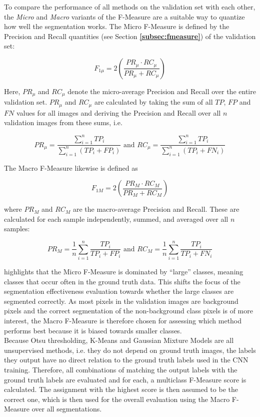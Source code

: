 \noindent To compare the performance of all methods on the validation set with each other, the \textit{Micro} and \textit{Macro} variants of the F-Measure \cite{micromacro} are a suitable way to quantize how well the segmentation works. The Micro F-Measure is defined by the Precision and Recall quantities (see Section \textbf{\ref{subsec:fmeasure}}) of the validation set:

\[ F_{1\mu} = 2 \left ( \frac{PR_\mu \cdot RC_\mu}{PR_\mu + RC_\mu} \right ) \]

\noindent Here, $PR_\mu$ and $RC_\mu$ denote the micro-average Precision and Recall over the entire validation set. $PR_\mu$ and $RC_\mu$ are calculated by taking the sum of all $TP$, $FP$ and $FN$ values for all images and deriving the Precision and Recall over all $n$ validation images from these sums, i.e.

\[ PR_\mu = \frac{\sum_{i=1}^{n} TP_i}{\sum_{i=1}^{n} (TP_i + FP_i)} \text{ and }  RC_\mu = \frac{\sum_{i=1}^{n} TP_i}{\sum_{i=1}^{n} (TP_i + FN_i)} \]

\noindent The Macro F-Measure likewise is defined as

\[ F_{1M} = 2 \left ( \frac{PR_M \cdot RC_M}{PR_M + RC_M} \right ) \]

\noindent where $PR_M$ and $RC_M$ are the macro-average Precision and Recall. These are calculated for each sample independently, summed, and averaged over all $n$ samples:

\[ PR_M = \frac{1}{n} \sum_{i=1}^{n} \frac{TP_i}{TP_i + FP_i} \text { and } RC_M = \frac{1}{n} \sum_{i=1}^{n} \frac{TP_i}{TP_i + FN_i} \] 

\noindent \cite[pp. 317-318]{information_retrieval} highlights that the Micro F-Measure is dominated by ``large'' classes, meaning classes that occur often in the ground truth data. This shifts the focus of the segmentation effectiveness evaluation towards whether the large classes are segmented correctly. As most pixels in the validation images are background pixels and the correct segmentation of the non-background class pixels is of more interest, the Macro F-Measure is therefore chosen for assessing which method performs best because it is biased towards smaller classes.\\

\noindent Because Otsu thresholding, K-Means and Gaussian Mixture Models are all unsupervised methods, i.e. they do not depend on ground truth images, the labels they output have no direct relation to the ground truth labels used in the CNN training. Therefore, all combinations of matching the output labels with the ground truth labels are evaluated and for each, a multiclass F-Measure score is calculated. The assignment with the highest score is then assumed to be the correct one, which is then used for the overall evaluation using the Macro F-Measure over all segmentations.


